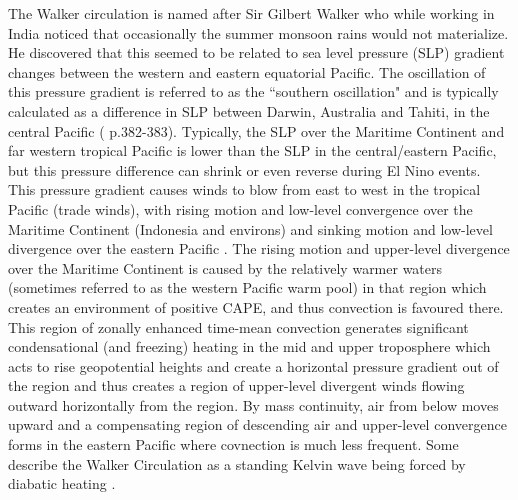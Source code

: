 \documentclass[letterpaper,12pt,titlepage,oneside,final]{book}
\begin{document}
The Walker circulation is named after Sir Gilbert Walker who while working in India noticed that occasionally the summer monsoon rains would not materialize. He discovered that this seemed to be related to sea level pressure (SLP) gradient changes between the western and eastern equatorial Pacific. The oscillation of this pressure gradient is referred to as the ``southern oscillation" and is typically calculated as a difference in SLP between Darwin, Australia and Tahiti, in the central Pacific (\cite{holton_introduction_2004} p.382-383). Typically, the SLP over the Maritime Continent and far western tropical Pacific is lower than the SLP in the central/eastern Pacific, but this pressure difference can shrink or even reverse during El Nino events. This pressure gradient causes winds to blow from east to west in the tropical Pacific (trade winds), with rising motion and low-level convergence over the Maritime Continent (Indonesia and environs) and sinking motion and low-level divergence over the eastern Pacific \cite{bjerknes_atmospheric_1969}. The rising motion and upper-level divergence over the Maritime Continent is caused by the relatively warmer waters (sometimes referred to as the western Pacific warm pool) in that region which creates an environment of positive CAPE, and thus convection is favoured there. This region of zonally enhanced time-mean convection generates significant condensational (and freezing) heating in the mid and upper troposphere which acts to rise geopotential heights and create a horizontal pressure gradient out of the region and thus creates a region of upper-level divergent winds flowing outward horizontally from the region. By mass continuity, air from below moves upward and a compensating region of descending air and upper-level convergence forms in the eastern Pacific where covnection is much less frequent. Some describe the Walker Circulation as a standing Kelvin wave being forced by diabatic heating \cite{stechmann_walker_2014}. 
\end{document}
